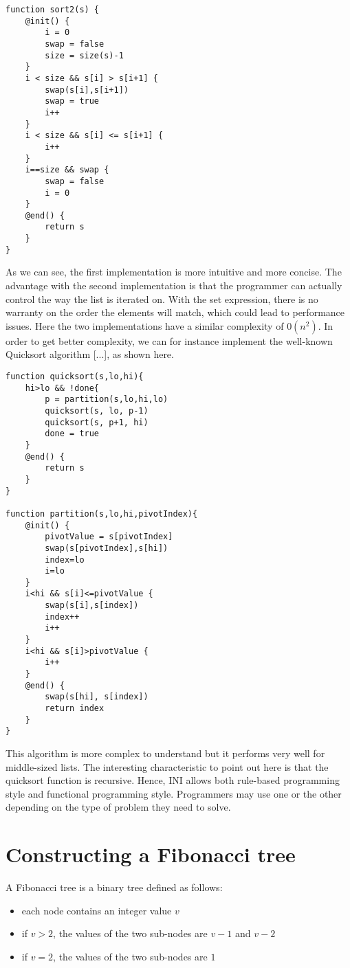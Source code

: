 \documentclass[11pt]{report}
\begin{document}
\begin{lstlisting}
function sort2(s) {
	@init() {
		i = 0
		swap = false
		size = size(s)-1
	}
	i < size && s[i] > s[i+1] {
		swap(s[i],s[i+1])
		swap = true
		i++
	}
	i < size && s[i] <= s[i+1] {
		i++
	}
	i==size && swap {
		swap = false
		i = 0
	}
	@end() {
		return s
	}
}
\end{lstlisting}

As we can see, the first implementation is more intuitive and more concise. The advantage with the second implementation is that the programmer can actually control the way the list is iterated on. With the set expression, there is no warranty on the order the elements will match, which could lead to performance issues. Here the two implementations have a similar complexity of $0(n^2)$. In order to get better complexity, we can for instance implement the well-known Quicksort algorithm [...], as shown here.


\begin{lstlisting}
function quicksort(s,lo,hi){
	hi>lo && !done{
		p = partition(s,lo,hi,lo)
		quicksort(s, lo, p-1)
		quicksort(s, p+1, hi)
		done = true
	}
	@end() {
		return s
	}
}

function partition(s,lo,hi,pivotIndex){
	@init() {
		pivotValue = s[pivotIndex]
		swap(s[pivotIndex],s[hi])
		index=lo
		i=lo
	}
	i<hi && s[i]<=pivotValue {
		swap(s[i],s[index])
		index++
		i++
	}
	i<hi && s[i]>pivotValue {
		i++
	}
	@end() {
		swap(s[hi], s[index])
		return index
	}
}
\end{lstlisting}

This algorithm is more complex to understand but it performs very well for middle-sized lists. The interesting characteristic to point out here is that the quicksort function is recursive. Hence, INI allows both rule-based programming style and functional programming style. Programmers may use one or the other depending on the type of problem they need to solve.

\section{Constructing a Fibonacci tree}

A Fibonacci tree is a binary tree defined as follows:

\begin{itemize}
\item each node contains an integer value $v$
\item if $v>2$, the values of the two sub-nodes are $v-1$ and $v-2$
\item if $v=2$, the values of the two sub-nodes are $1$
\end{itemize}
\end{document}
